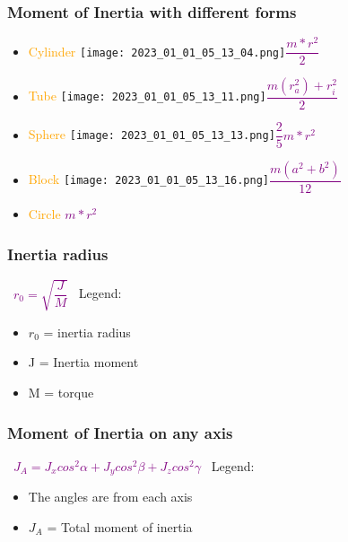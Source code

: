 \documentclass[main.tex,fontsize=8pt,paper=a4,paper=portrait,DIV=calc,]{scrartcl}
\begin{document}
\begin{multicols*}{2}
\subsubsection{Moment of Inertia with different forms}
\begin{itemize}
  \item \textcolor{orange}{Cylinder} \newline
    \texttt{[image: 2023\_01\_01\_05\_13\_04.png]}\textcolor{purple}{\( \dfrac{m * r^2}{2} \)}
  \item \textcolor{orange}{Tube} \newline
    \texttt{[image: 2023\_01\_01\_05\_13\_11.png]}\textcolor{purple}{\( \dfrac{m(r^2_a) + r^2_i}{2} \)}
  \item \textcolor{orange}{Sphere} \newline
    \texttt{[image: 2023\_01\_01\_05\_13\_13.png]}\textcolor{purple}{\( \dfrac{2}{5} m * r^2 \)}
  \item \textcolor{orange}{Block} \newline
    \texttt{[image: 2023\_01\_01\_05\_13\_16.png]}\textcolor{purple}{\( \dfrac{m(a^2 + b^2)}{12} \)}
  \item \textcolor{orange}{Circle}\newline
    \textcolor{purple}{\( m * r^2 \)}
\end{itemize} 

\subsubsection{Inertia radius}
\, \newline
\large \textcolor{purple}{\( r_0 = \sqrt{\dfrac{J}{M}} \)}\newline
\, \newline
\normalsize Legend: \newline
\begin{itemize}
\item \(r_0\) = inertia radius
\item J = Inertia moment
\item M = torque 
\end{itemize} 

\subsubsection{Moment of Inertia on any axis}
\, \newline
\large \textcolor{purple}{\( J_A = J_x cos^2 \alpha + J_y cos^2 \beta + J_z cos^2 \gamma \)}\newline
\, \newline
\normalsize Legend: \newline
\begin{itemize}
\item The angles are from each axis
\item \(J_A\) = Total moment of inertia
\end{itemize} 


\end{multicols*}
\end{document}
